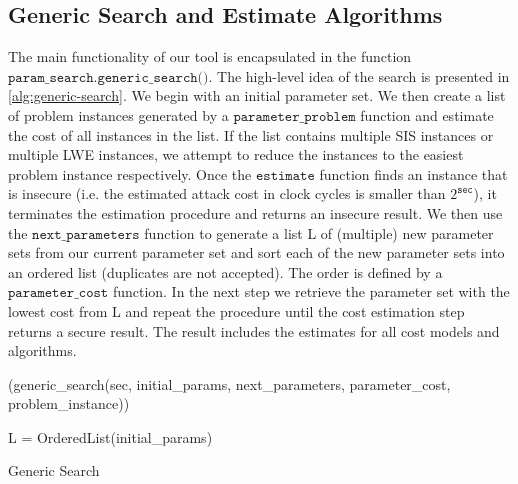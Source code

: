 \subsection{Generic Search and Estimate Algorithms}
The main functionality of our tool is encapsulated in the function $\texttt{param\_search.generic\_search()}$. The high-level idea of the search is presented in \cref{alg:generic-search}. We begin with an initial parameter set. We then create a list of problem instances generated by a $\texttt{parameter\_problem}$ function and estimate the cost of all instances in the list. If the list contains multiple SIS instances or multiple LWE instances, we attempt to reduce the instances to the easiest problem instance respectively. %
Once the $\texttt{estimate}$ function finds an instance that is insecure (i.e. the estimated attack cost in clock cycles is smaller than $2^{\texttt{sec}}$), it terminates the estimation procedure and returns an insecure result. We then use the $\texttt{next\_parameters}$ function to generate a list L of (multiple) new parameter sets from our current parameter set and sort each of the new parameter sets into an ordered list (duplicates are not accepted). The order is defined by a $\texttt{parameter\_cost}$ function. In the next step we retrieve the parameter set with the lowest cost from L and repeat the procedure until the cost estimation step returns a secure result. The result includes the estimates for all cost models and algorithms.

\begin{algorithm2e} %
    \Begin(generic\_search(sec, initial\_params, next\_parameters, parameter\_cost,  problem\_instance)) %
    {
        L = OrderedList(initial\_params)\\

    }
    \caption{Generic Search} \label{alg:generic-search}
\end{algorithm2e}

